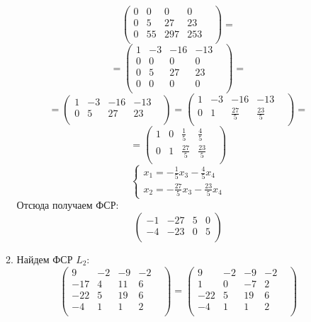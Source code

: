 \documentclass[a4paper,12pt]{article}
\begin{document}
\begin{itemize}
\begin{enumerate}
\[\begin{pmatrix}
0 & 0 & 0 & 0 & \\
0 & 5 & 27 & 23 & \\
0 & 55 & 297 & 253 & \\
\end{pmatrix}
=
\]
\[
=
\begin{pmatrix}
1 & -3 & -16 & -13 & \\
0 & 0 & 0 & 0 & \\
0 & 5 & 27 & 23 & \\
0 & 0 & 0 & 0 & \\
\end{pmatrix}
=
\]
\[
=
\begin{pmatrix}
1 & -3 & -16 & -13 & \\
0 & 5 & 27 & 23 & \\
\end{pmatrix}
=
\begin{pmatrix}
1 & -3 & -16 & -13 & \\
0 & 1 & \frac{27}{5}& \frac{23}{5} & \\
\end{pmatrix}
=
\]
\[
=
\begin{pmatrix}
1 & 0 & \frac{1}{5} & \frac{4}{5} & \\
0 & 1 & \frac{27}{5}& \frac{23}{5} & \\
\end{pmatrix}
\]
\[
\begin{cases}
x_1 = -\frac{1}{5}x_3 - \frac{4}{5}x_4 \\
x_2 = -\frac{27}{5}x_3 - \frac{23}{5}x_4
\end{cases}
\]
Отсюда получаем ФСР:
\[
\begin{pmatrix}
-1 & -27 & 5 & 0 \\
-4 & -23 & 0 & 5 \\
\end{pmatrix}
\]
\item 
Найдем ФСР $L_2$:
\[
\begin{pmatrix}
9 & -2 & -9 & -2 & \\
-17 & 4 & 11 & 6 & \\
-22 & 5 & 19 & 6 & \\
-4 & 1 & 1 & 2 & \\
\end{pmatrix}
=
\begin{pmatrix}
9 & -2 & -9 & -2 & \\
1 & 0 & -7 & 2 & \\
-22 & 5 & 19 & 6 & \\
-4 & 1 & 1 & 2 & \\

\end{pmatrix}\]
\end{enumerate}
\end{itemize}
\end{document}
